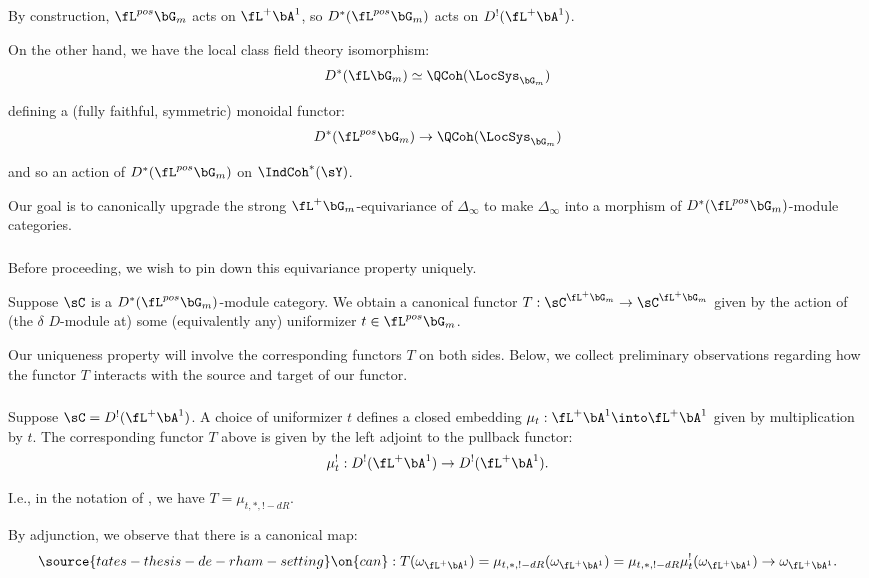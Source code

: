 By construction, $\fL^{pos} \bG_m$ acts on $\fL^+\bA^1$, so
$D^*(\fL^{pos} \bG_m)$ acts on $D^!(\fL^+\bA^1)$.

On the other hand, we have the local class field theory isomorphism:
%
\[
D^*(\fL \bG_m) \simeq \QCoh(\LocSys_{\bG_m})
\]

 defining a (fully faithful, symmetric) monoidal functor:
%
\[
D^*(\fL^{pos} \bG_m) \to \QCoh(\LocSys_{\bG_m})
\]

 and so an action of $D^*(\fL^{pos} \bG_m)$ on
$\IndCoh^*(\sY)$.

Our goal is to canonically upgrade the strong
$\fL^+\bG_m$-equivariance of $\Delta_{\infty}$ to make $\Delta_{\infty}$
into a morphism of $D^*(\fL^{pos} \bG_m)$-module categories.

\subsubsection{}

Before proceeding, we wish to pin down this equivariance property uniquely.

Suppose $\sC$ is a $D^*(\fL^{pos} \bG_m)$-module category.
We obtain a canonical functor $T:\sC^{\fL^+\bG_m} \to \sC^{\fL^+\bG_m}$
given by the action of (the $\delta$ $D$-module at)
some (equivalently any) uniformizer $t \in \fL^{pos} \bG_m$.

Our uniqueness property will involve the corresponding functors $T$ on both
sides. Below, we collect preliminary observations regarding how the
functor $T$ interacts with the source and target of our functor.

\subsubsection{}

Suppose $\sC = D^!(\fL^+\bA^1)$. A choice of uniformizer $t$ defines
a closed embedding $\mu_t:\fL^+\bA^1 \into \fL^+ \bA^1$ given by multiplication
by $t$. The corresponding functor $T$ above is given by the left adjoint
to the pullback functor:
%
\[
\mu_t^!:D^!(\fL^+\bA^1) \to D^!(\fL^+ \bA^1).
\]

 I.e., in the notation of \cite{dmod}, we have $T = \mu_{t,*,!-dR}$.

By adjunction, we observe that there is a canonical map:
%
\begin{equation}\label{eq:can-unit-geom}
\source{tates-thesis-de-rham-setting}
\on{can}:T(\omega_{\fL^+\bA^1}) = \mu_{t,*,!-dR}(\omega_{\fL^+\bA^1}) =
\mu_{t,*,!-dR}\mu_t^!(\omega_{\fL^+\bA^1}) \to
\omega_{\fL^+\bA^1}.
\end{equation}

